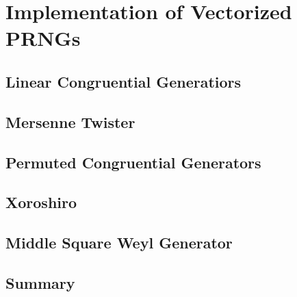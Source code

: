 \documentclass{stdlocal}
\begin{document}
\section{Implementation of Vectorized PRNGs} %
\label{sec:implementation}
  \subsection{Linear Congruential Generatiors} %
  \label{sub:linear_congruential_generatiors}


  \subsection{Mersenne Twister} %
  \label{sub:mersenne_twister}


  \subsection{Permuted Congruential Generators} %
  \label{sub:permuted_congruential_generators}


  \subsection{Xoroshiro} %
  \label{sub:xoroshiro}


  \subsection{Middle Square Weyl Generator} %
  \label{sub:middle_square_weyl_generator}


  \subsection{Summary} %
  \label{sub:summary}

\end{document}
